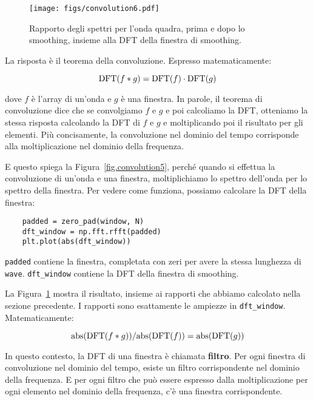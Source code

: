 \documentclass[12pt,a4paper]{book}
\begin{document}
\begin{figure} 

\centerline{\texttt{[image: figs/convolution6.pdf]}} \caption{Rapporto degli spettri per l'onda quadra, prima e dopo lo smoothing, insieme alla DFT della finestra di smoothing.} \label{fig.convolution6} \end{figure} 

\newcommand{\DFT}{\mathrm{DFT}} \newcommand{\IDFT}{\mathrm{IDFT}}

La risposta è il teorema della convoluzione. Espresso matematicamente:

%
\[ \DFT(f \conv g) = \DFT(f) \cdot \DFT(g) \] 

%
dove $f$ è l'array di un'onda e $g$ è una finestra. In parole, il teorema di convoluzione dice che se convolgiamo $f$ e $g$ e poi calcoliamo la DFT, otteniamo la stessa risposta calcolando la DFT di $f$ e $g$ e moltiplicando poi il risultato per gli elementi. Più concisamente, la convoluzione nel dominio del tempo corrisponde alla moltiplicazione nel dominio della frequenza.

E questo spiega la Figura~\ref{fig.convolution5}, perché quando si effettua la convoluzione di un'onda e una finestra, moltiplichiamo lo spettro dell'onda per lo spettro della finestra. Per vedere come funziona, possiamo calcolare la DFT della finestra:

\begin{verbatim} 
    padded = zero_pad(window, N)
    dft_window = np.fft.rfft(padded)
    plt.plot(abs(dft_window))
 \end{verbatim} 

{\tt padded} contiene la finestra, completata con zeri per avere la stessa lunghezza di {\tt wave}. \verb"dft_window" contiene la DFT della finestra di smoothing.

\newcommand{\abs}{\mathrm{abs}}

La Figura~\ref{fig.convolution6} mostra il risultato, insieme ai rapporti che abbiamo calcolato nella sezione precedente. I rapporti sono esattamente le ampiezze in \verb"dft_window". Matematicamente:

%
\[ \abs(\DFT(f \conv g)) / \abs(\DFT(f)) = \abs(\DFT(g)) \] 

%
In questo contesto, la DFT di una finestra è chiamata {\bf filtro}. Per ogni finestra di convoluzione nel dominio del tempo, esiste un filtro corrispondente nel dominio della frequenza. E per ogni filtro che può essere espresso dalla moltiplicazione per ogni elemento nel dominio della frequenza, c'è una finestra corrispondente.
\end{document}
